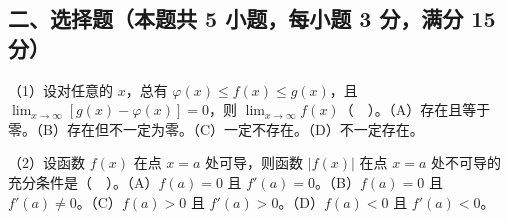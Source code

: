 \documentclass[UTF8,12pt]{ctexart}
\begin{document}
\subsection*{二、选择题（本题共 5 小题，每小题 3 分，满分 15 分）}

（1）设对任意的 \(\displaystyle x\)，总有 \(\displaystyle \varphi(x)\le f(x)\le g(x)\)，且 \(\displaystyle \lim_{x\to\infty}[g(x)-\varphi(x)]=0\)，则 \(\displaystyle \lim_{x\to\infty}f(x)\)（　）。（A）存在且等于零。（B）存在但不一定为零。（C）一定不存在。（D）不一定存在。


（2）设函数 \(\displaystyle f(x)\) 在点 \(\displaystyle x=a\) 处可导，则函数 \(\displaystyle |f(x)|\) 在点 \(\displaystyle x=a\) 处不可导的充分条件是（　）。（A）\(\displaystyle f(a)=0\) 且 \(\displaystyle f'(a)=0\)。（B）\(\displaystyle f(a)=0\) 且 \(\displaystyle f'(a)\ne0\)。（C）\(\displaystyle f(a)>0\) 且 \(\displaystyle f'(a)>0\)。（D）\(\displaystyle f(a)<0\) 且 \(\displaystyle f'(a)<0\)。
\end{document}
